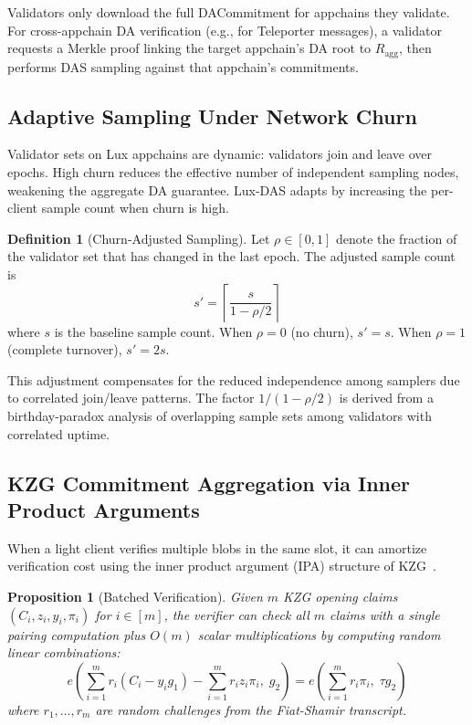 \documentclass[11pt,a4paper]{article}
\theoremstyle{plain}
\newtheorem{proposition}{Proposition}[section]
\theoremstyle{definition}
\newtheorem{definition}{Definition}[section]
\theoremstyle{remark}
\begin{document}
Validators only download the full DACommitment for appchains they validate. For cross-appchain
DA verification (e.g., for Teleporter messages), a validator requests a Merkle proof linking
the target appchain's DA root to $R_{\text{agg}}$, then performs DAS sampling against that
appchain's commitments.

\subsection{Adaptive Sampling Under Network Churn}

Validator sets on Lux appchains are dynamic: validators join and leave over epochs. High
churn reduces the effective number of independent sampling nodes, weakening the aggregate
DA guarantee. Lux-DAS adapts by increasing the per-client sample count when churn is high.

\begin{definition}[Churn-Adjusted Sampling]
Let $\rho \in [0,1]$ denote the fraction of the validator set that has changed in the last
epoch. The adjusted sample count is
\[
    s' = \left\lceil \frac{s}{1 - \rho/2} \right\rceil
\]
where $s$ is the baseline sample count. When $\rho = 0$ (no churn), $s' = s$. When
$\rho = 1$ (complete turnover), $s' = 2s$.
\end{definition}

This adjustment compensates for the reduced independence among samplers due to correlated
join/leave patterns. The factor $1/(1 - \rho/2)$ is derived from a birthday-paradox analysis
of overlapping sample sets among validators with correlated uptime.

\subsection{KZG Commitment Aggregation via Inner Product Arguments}

When a light client verifies multiple blobs in the same slot, it can amortize verification
cost using the inner product argument (IPA) structure of KZG~\cite{bowe2019recursive}.

\begin{proposition}[Batched Verification]
\label{prop:batched-verification}
Given $m$ KZG opening claims $(C_i, z_i, y_i, \pi_i)$ for $i \in [m]$, the verifier can
check all $m$ claims with a single pairing computation plus $O(m)$ scalar multiplications
by computing random linear combinations:
\[
    e\left(\sum_{i=1}^{m} r_i(C_i - y_i g_1) - \sum_{i=1}^{m} r_i z_i \pi_i,\; g_2\right)
    = e\left(\sum_{i=1}^{m} r_i \pi_i,\; \tau g_2\right)
\]
where $r_1, \ldots, r_m$ are random challenges from the Fiat-Shamir transcript.
\end{proposition}
\end{document}
